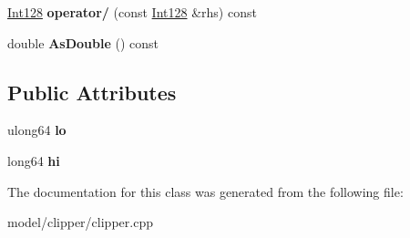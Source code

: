 \begin{DoxyCompactItemize}
\item 
\hypertarget{classClipperLib_1_1Int128_a91718f7da0f2442e03e69b019f21dd7d}{\hyperlink{classClipperLib_1_1Int128}{Int128} {\bfseries operator/} (const \hyperlink{classClipperLib_1_1Int128}{Int128} \&rhs) const }\label{classClipperLib_1_1Int128_a91718f7da0f2442e03e69b019f21dd7d}

\item 
\hypertarget{classClipperLib_1_1Int128_a6629ebee1d059ea486c789eaa24fb994}{double {\bfseries As\-Double} () const }\label{classClipperLib_1_1Int128_a6629ebee1d059ea486c789eaa24fb994}

\end{DoxyCompactItemize}
\subsection*{Public Attributes}
\begin{DoxyCompactItemize}
\item 
\hypertarget{classClipperLib_1_1Int128_a991b9da6e53c777a94fca640e505b258}{ulong64 {\bfseries lo}}\label{classClipperLib_1_1Int128_a991b9da6e53c777a94fca640e505b258}

\item 
\hypertarget{classClipperLib_1_1Int128_a167643d0860a14fb563e055511e15e14}{long64 {\bfseries hi}}\label{classClipperLib_1_1Int128_a167643d0860a14fb563e055511e15e14}

\end{DoxyCompactItemize}


The documentation for this class was generated from the following file\-:\begin{DoxyCompactItemize}
\item 
model/clipper/clipper.\-cpp\end{DoxyCompactItemize}
